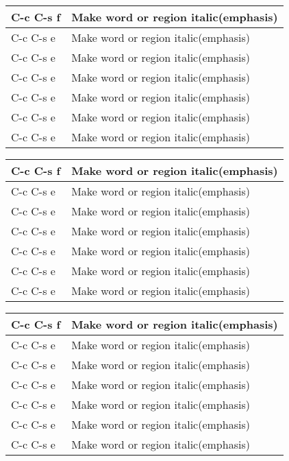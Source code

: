 \documentclass[landscape, zihao=5]{ctexart}
\begin{document}
\begin{multicols}{3}
\begin{tabu}{|X[1]|X[3]|}
  \end{tabu}
  \vspace{0.5cm}
  \begin{tabu}{|X[1]|X[3]|}
    \hline
    C-c C-s f & Make word or region italic(emphasis) \\ \hline
    C-c C-s e & Make word or region italic(emphasis) \\
    C-c C-s e & Make word or region italic(emphasis) \\
    C-c C-s e & Make word or region italic(emphasis) \\
    C-c C-s e & Make word or region italic(emphasis) \\
    C-c C-s e & Make word or region italic(emphasis) \\
    C-c C-s e & Make word or region italic(emphasis) \\
  \end{tabu}
  \begin{tabu}{|X[1]|X[3]|}
    \hline
    C-c C-s f & Make word or region italic(emphasis) \\ \hline
    C-c C-s e & Make word or region italic(emphasis) \\
    C-c C-s e & Make word or region italic(emphasis) \\
    C-c C-s e & Make word or region italic(emphasis) \\
    C-c C-s e & Make word or region italic(emphasis) \\
    C-c C-s e & Make word or region italic(emphasis) \\
    C-c C-s e & Make word or region italic(emphasis) \\
  \end{tabu}
  \begin{tabu}{|X[1]|X[3]|}
    \hline
    C-c C-s f & Make word or region italic(emphasis) \\ \hline
    C-c C-s e & Make word or region italic(emphasis) \\
    C-c C-s e & Make word or region italic(emphasis) \\
    C-c C-s e & Make word or region italic(emphasis) \\
    C-c C-s e & Make word or region italic(emphasis) \\
    C-c C-s e & Make word or region italic(emphasis) \\
    C-c C-s e & Make word or region italic(emphasis) \\
    \hline
  \end{tabu}


\end{multicols}
\end{document}
